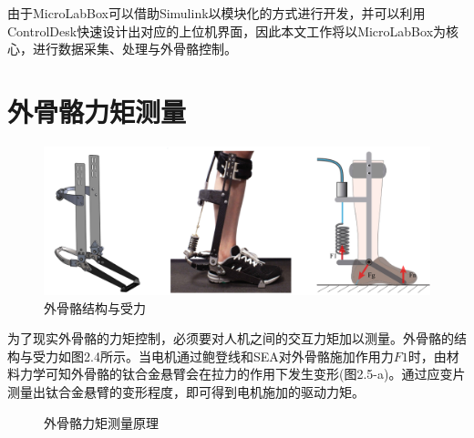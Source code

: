 由于MicroLabBox可以借助Simulink以模块化的方式进行开发，并可以利用ControlDesk快速设计出对应的上位机界面，因此本文工作将以MicroLabBox为核心，进行数据采集、处理与外骨骼控制。

\section{外骨骼力矩测量}

\begin{figure}[htb]
    \includegraphics[width=14cm]{fig/f23.jpg}
    \caption{外骨骼结构与受力}
    \label{fig:mark}
\end{figure}

为了现实外骨骼的力矩控制，必须要对人机之间的交互力矩加以测量。外骨骼的结构与受力如图2.4所示。当电机通过鲍登线和SEA对外骨骼施加作用力$F1$时，由材料力学可知外骨骼的钛合金悬臂会在拉力的作用下发生变形(图2.5-a)。通过应变片测量出钛合金悬臂的变形程度，即可得到电机施加的驱动力矩。

\begin{figure}[htb]
    \quad
    \caption{外骨骼力矩测量原理}
    \label{fig:subfigss}
\end{figure}

